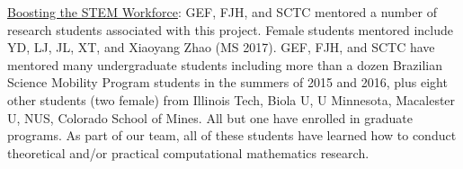 \documentclass[11pt]{NSFamsart}
\newcommand{\Upara}[1]{\noindent\underline{\upshape #1}:}
\begin{document}
\Upara{Boosting the STEM Workforce} GEF, FJH, and SCTC mentored a number of 
research students associated with this project.  Female students mentored include YD, LJ, JL, XT, and Xiaoyang Zhao (MS 2017).   GEF, FJH,  and SCTC have mentored many undergraduate students including more than a dozen 
Brazilian Science Mobility Program students in the summers of 2015 and 2016, plus eight other students (two female) from Illinois Tech, Biola U, U Minnesota, Macalester U, NUS, Colorado School of Mines.  All but one have enrolled in graduate programs.   As part of our team, all of
these students have learned how to conduct theoretical and/or practical computational mathematics research.


\newpage
\clearpage
\setcounter{page}{1}




{\renewcommand\addcontentsline[3]{} 
\renewcommand{\refname}{{\Large\textbf{References Cited}}}                   %
\renewcommand{\bibliofont}{\normalsize}

}
\end{document}
